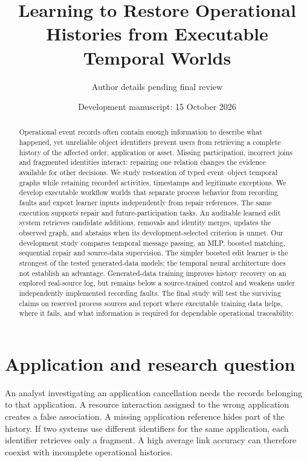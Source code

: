 \documentclass[11pt]{article}
\title{Learning to Restore Operational Histories from Executable Temporal Worlds}
\author{Author details pending final review}
\date{Development manuscript: 15 October 2026}
\begin{document}
\maketitle
\begin{center}\end{center}

\begin{abstract}
Operational event records often contain enough information to describe what happened, yet unreliable object identifiers prevent users from retrieving a complete history of the affected order, application or asset. Missing participation, incorrect joins and fragmented identities interact: repairing one relation changes the evidence available for other decisions. We study restoration of typed event--object temporal graphs while retaining recorded activities, timestamps and legitimate exceptions. We develop executable workflow worlds that separate process behavior from recording faults and export learner inputs independently from repair references. The same execution supports repair and future-participation tasks. An auditable learned edit system retrieves candidate additions, removals and identity merges, updates the observed graph, and abstains when its development-selected criterion is unmet. Our development study compares temporal message passing, an MLP, boosted matching, sequential repair and source-data supervision. The simpler boosted edit learner is the strongest of the tested generated-data models; the temporal neural architecture does not establish an advantage. Generated-data training improves history recovery on an explored real-source log, but remains below a source-trained control and weakens under independently implemented recording faults. The final study will test the surviving claims on reserved process sources and report where executable training data helps, where it fails, and what information is required for dependable operational traceability.
\end{abstract}

\section{Application and research question}
An analyst investigating an application cancellation needs the records belonging to that application. A resource interaction assigned to the wrong application creates a false association. A missing application reference hides part of the history. If two systems use different identifiers for the same application, each identifier retrieves only a fragment. A high average link accuracy can therefore coexist with incomplete operational histories.
\end{document}
